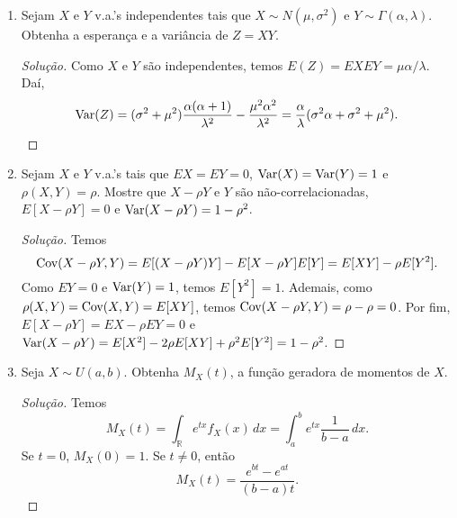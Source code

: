 \documentclass[../Notas.tex]{subfiles}
\begin{document}
\begin{enumerate}
\begin{proof}[Solução]
\begin{align*}
            E(XY) &= \iint_{\mathbb{R}^2} xyf_{X,Y}(x,y) \, dx \, dy \\
                  &= \frac{\sqrt{15}}{4\pi}\frac{\sqrt{2\pi}}{2}
                  \sqrt{2\pi}\sqrt{\frac{4}{15}}
                  \int_{\mathbb{R}} \frac{1}{\sqrt{2\pi}}\cdot\frac{y^2}{\sqrt{4/15}}
                  \exp(-15y^2/8) \, dy \\
                  &= \frac{2}{15}.
        \end{align*}
        Portanto,
        \[
        \rho(X,Y) = \frac{1}{4}.
        \]
    \end{proof}
    \item Sejam $X$ e $Y$ v.a.’s independentes tais que $X\sim N(\mu, \sigma^2)$ e $Y\sim\Gamma(\alpha,\lambda)$. Obtenha a esperança e a variância de $Z = XY$.
    \begin{proof}[Solução]
        Como $X$ e $Y$ são independentes, temos $E(Z) = EXEY = \mu\alpha/\lambda$. Daí,
        \[
        \text{Var}(Z) = (\sigma^2 + \mu^2)\frac{\alpha(\alpha+1)}{\lambda^2} 
        - \frac{\mu^2\alpha^2}{\lambda^2} 
                = \frac{\alpha}{\lambda}(\sigma^2\alpha + \sigma^2 + \mu^2).
        \]
    \end{proof}
    \item Sejam $X$ e $Y$ v.a.’s tais que $EX = EY = 0$, $\text{Var}(X) = \text{Var}(Y) = 1$ e $\rho(X, Y) = \rho$. Mostre que $X - \rho Y$ e $Y$ são não-correlacionadas, $E[X - \rho Y] = 0$ e $\text{Var}(X - \rho Y) = 1 - \rho^2$.
    \begin{proof}[Solução]
        Temos
        \[
        \text{Cov}(X-\rho Y, Y) = E[(X - \rho Y)Y] - E[X-\rho Y]E[Y] = E[XY] - \rho E[Y^2].
        \]
        Como $EY = 0$ e $\text{Var}(Y) = 1$, temos $E[Y^2] = 1$. Ademais, como 
        $\rho(X,Y) = \text{Cov}(X,Y) = E[XY]$, temos $\text{Cov}(X-\rho Y, Y) = \rho - \rho = 0$.
        Por fim, $E[X - \rho Y] = EX - \rho EY = 0$ e $\text{Var}(X-\rho Y) = E[X^2] - 2\rho E[XY] + \rho^2E[Y^2] = 1 - \rho^2$.
    \end{proof}
    \item Seja $X\sim U(a,b)$. Obtenha $M_X(t)$, a função geradora de momentos de $X$.
    \begin{proof}[Solução]
        Temos
        \[
        M_X(t) = \int_{\mathbb{R}} e^{tx} f_X(x) \, dx 
               = \int_a^b e^{tx}\frac{1}{b-a} \, dx.
        \]
        Se $t=0$, $M_X(0) = 1$. Se $t\neq 0$, então
        \[
        M_X(t) = \frac{e^{bt} - e^{at}}{(b-a)t}.
\]
\end{proof}
\end{enumerate}
\end{document}
